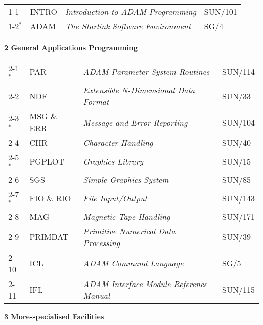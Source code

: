 \documentclass[twoside,11pt]{article}
\newcommand{\latex}[1]{#1}
\newcommand{\xref}[3]{#1}
\newcommand{\changed}{\bf $^*$}
\begin{document}
\begin{tabular}{p{8mm}p{27mm}p{90mm}l}
1-1 & INTRO & {\em Introduction to ADAM Programming} & \xref{SUN/101}{sun101}{}\\
1-2\changed & ADAM & {\em The Starlink Software Environment} & \xref{SG/4}{sg4}{}\\
\end{tabular}

\latex{\vspace{2ex}}
{\Large \bf 2 General Applications Programming}

\begin{tabular}{p{8mm}p{27mm}p{90mm}l}
2-1\changed & PAR & {\em ADAM Parameter System Routines} & \xref{SUN/114}{sun114}{}\\
2-2 & NDF & {\em Extensible N-Dimensional Data Format} & \xref{SUN/33}{sun33}{}\\
2-3\changed & MSG \& ERR & {\em Message and Error Reporting} & \xref{SUN/104}{sun104}{}\\
2-4 & CHR & {\em Character Handling} & \xref{SUN/40}{sun40}{}\\
2-5\changed & PGPLOT & {\em Graphics Library} & \xref{SUN/15}{sun15}{}\\
2-6 & SGS & {\em Simple Graphics System} & \xref{SUN/85}{sun85}{}\\
2-7\changed & FIO \& RIO & {\em File Input/Output} & \xref{SUN/143}{sun143}{}\\
2-8 & MAG & {\em Magnetic Tape Handling} & \xref{SUN/171}{sun2}{}\\
2-9 & PRIMDAT & {\em Primitive Numerical Data Processing} & \xref{SUN/39}{sun39}{}\\
2-10 & ICL & {\em ADAM Command Language} & \xref{SG/5}{sg5}{}\\
2-11 & IFL & {\em ADAM Interface Module Reference Manual} & \xref{SUN/115}{sun115}{}\\
\end{tabular}

\latex{\newpage}
\latex{\vspace{2ex}}
{\Large \bf 3 More-specialised Facilities}
\end{document}
